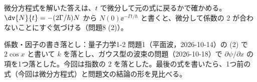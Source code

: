 \documentclass[uplatex,dvipdfmx,a4paper,11pt]{jsarticle}
\begin{document}
\matome
\begin{saitenichiran}
\end{saitenichiran}
\begin{daiji}
  \item 微分方程式を解いた答えは、$t$ で微分して元の式に戻るかで確かめる。$\dv{N}{t}=-(2\Gamma/\hbar)N$ から $N(0)\ee^{-\Gamma t/\hbar}$ と書くと、微分して係数の 2 が合わないことにすぐ気づける（問題8 (2)）。
\end{daiji}
\begin{maemo}
  \item 係数・因子の書き落とし：量子力学1-2 問題1（平面波，2026-10-14）の (2) で $2\cos x$ と書いて $k$ を落とし、ガウス型の波束の問題（2026-10-18）で $\partial\psi/\partial x$ の項を1つ落とした。今回は指数の 2 を落とした。最後の式を書いたら、1つ前の式（今回は微分方程式）と問題文の結論の形を見比べる。
\end{maemo}
\end{document}
